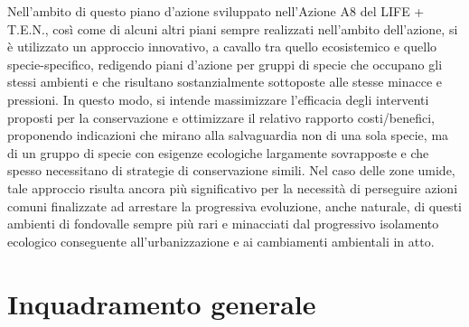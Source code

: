 \documentclass[10pt,twoside,openany,x11names,svgnames,italian,a5paper,dvipsnames,table]{memoir}
\newcommand\chapterillustration{}
\begin{document}
Nell'ambito di questo piano d'azione sviluppato nell'Azione A8 del LIFE + T.E.N., così come di alcuni altri piani sempre realizzati nell'ambito dell'azione, si è utilizzato un approccio innovativo, a cavallo tra quello ecosistemico e quello specie-specifico, redigendo piani d'azione per gruppi di specie che occupano gli stessi ambienti e che risultano sostanzialmente sottoposte alle stesse minacce e pressioni. In questo modo, si intende massimizzare l'efficacia degli interventi proposti per la conservazione e ottimizzare il relativo rapporto costi/benefici, proponendo indicazioni che mirano alla salvaguardia non di una sola specie, ma di un gruppo di specie con esigenze ecologiche largamente sovrapposte e che spesso necessitano di strategie di conservazione simili.
Nel caso delle zone umide, tale approccio risulta ancora più significativo per la necessità di perseguire azioni comuni finalizzate ad arrestare la progressiva evoluzione, anche naturale, di questi ambienti di fondovalle sempre più rari e minacciati dal progressivo isolamento ecologico conseguente all’urbanizzazione e ai cambiamenti ambientali in atto.




\normalsize
\setlength\afterchapskip{52mm}
\chapter{Inquadramento generale}
\renewcommand\chapterillustration{1.JPG}
\end{document}
